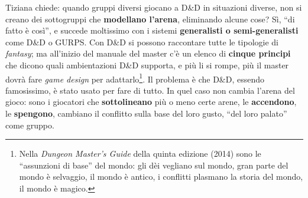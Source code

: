 Tiziana chiede: quando gruppi diversi giocano a D\&D in situazioni diverse, non si creano dei
sottogruppi che \textbf{modellano l'arena}, eliminando alcune cose? Sì, ``di fatto è così'', e
succede moltissimo con i sistemi \textbf{generalisti o semi-generalisti} come D\&D o GURPS. Con D\&D
si possono raccontare tutte le tipologie di \emph{fantasy}; ma all'inizio del manuale del master c'è
un elenco di \textbf{cinque principi} che dicono quali ambientazioni D\&D supporta, e più li si
rompe, più il master dovrà fare \emph{game design} per adattarlo\footnote{Nella \emph{Dungeon
Master's Guide} della quinta edizione (2014) sono le ``assunzioni di base'' del mondo: gli dèi
vegliano sul mondo, gran parte del mondo è selvaggio, il mondo è antico, i conflitti plasmano la
storia del mondo, il mondo è magico.}. Il problema è che D\&D, essendo famosissimo, è stato usato
per fare di tutto. In quel caso non cambia l'arena del gioco: sono i giocatori che
\textbf{sottolineano} più o meno certe arene, le \textbf{accendono}, le \textbf{spengono}, cambiano
il conflitto sulla base del loro gusto, ``del loro palato'' come gruppo.

